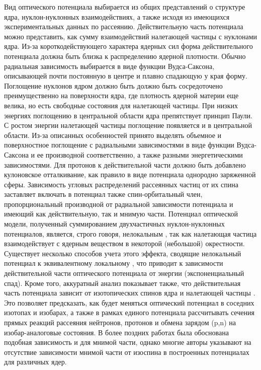 Вид оптического потенциала выбирается из общих представлений о структуре ядра, нуклон-нуклонных взаимодействиях, а также исходя из имеющихся экспериментальных данных по рассеянию.
Действительную часть потенциала можно представить, как сумму взаимодействий налетающей частицы с нуклонами ядра. Из-за короткодействующего характера ядерных сил форма действительного потенциала должна быть близка к распределению ядерной плотности. Обычно радиальная зависимость выбирается в виде функции Вудса-Саксона, описывающей почти постоянную в центре и плавно спадающую у края форму.
Поглощение нуклонов ядром должно быть должно быть сосредоточено преимущественно на поверхности ядра, где плотность ядерной материи еще велика, но есть свободные состояния для налетающей частицы. При низких энергиях поглощению в центральной области ядра препятствует принцип Паули. С ростом энергии налетающей частицы поглощение появляется и в центральной области. Из-за описанных особенностей принято выделять объемное и поверхностное поглощение с радиальными зависимостями в виде функции Вудса-Саксона и ее производной соответственно, а также разными энергетическими зависимостями.
Для протонов к действительной части должно быть добавлено кулоновское отталкивание, как правило в виде потенциала однородно заряженной сферы.
Зависимость угловых распределений рассеянных частиц от их спина заставляет включать в потенциал также спин-орбитальный член, пропорциональный производной от радиальной зависимости потенциала и имеющий как действительную, так и мнимую части.
Потенциал оптической модели, полученный суммированием двухчастичных нуклон-нуклонных потенциалов, является, строго говоря, нелокальным \cite{Brueckner1095}, так как налетающая частица взаимодействует с ядерным веществом в некоторой (небольшой) окрестности. Существует несколько способов учета этого эффекта, сводящие нелокальный потенциал к эквивалентному локальному \cite{Perey1962,Lipperheide1967}, что приводит к зависимости действительной части оптического потенциала от энергии (экспоненциальный спад).
Кроме того, аккуратный анализ показывает также, что действительная часть потенциала зависит от изотопических спинов ядра и налетающей частицы \cite{LanePRL1962,LaneNP1962}. Это позволяет предсказать, как будет меняться оптический потенциал в соседних изотопах и изобарах, а также в рамках единого потенциала рассчитывать сечения прямых реакций рассеяния нейтронов, протонов и обмена зарядом (p,n) на изобар-аналоговые состояния. В более поздних работах \cite{SatchlerBook1969} была обоснована подобная зависимость и для мнимой части, однако многие авторы указывают на отсутствие зависимости мнимой части от изоспина в построенных потенциалах для различных ядер.
